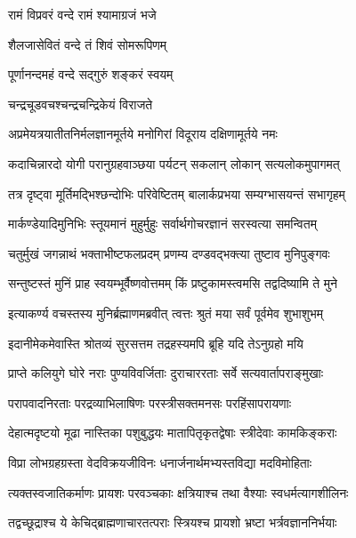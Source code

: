

{रामं विप्रवरं वन्दे रामं श्यामाग्रजं भजे}

{शैलजासेवितं वन्दे तं शिवं सोमरूपिणम्}

{पूर्णानन्दमहं वन्दे सद्गुरुं शङ्करं स्वयम्}

{चन्द्रचूडवचश्चन्द्रचन्द्रिकेयं विराजते}

\twolineshloka
{अप्रमेयत्रयातीतनिर्मलज्ञानमूर्तये}
{मनोगिरां विदूराय दक्षिणामूर्तये नमः} %


\twolineshloka
{कदाचिन्नारदो योगी परानुग्रहवाञ्छया}
{पर्यटन् सकलान् लोकान् सत्यलोकमुपागमत्} %

\twolineshloka
{तत्र दृष्ट्वा मूर्तिमद्भिश्छन्दोभिः परिवेष्टितम्}
{बालार्कप्रभया सम्यग्भासयन्तं सभागृहम्} %

\twolineshloka
{मार्कण्डेयादिमुनिभिः स्तूयमानं मुहुर्मुहुः}
{सर्वार्थगोचरज्ञानं सरस्वत्या समन्वितम्} %

\twolineshloka
{चतुर्मुखं जगन्नाथं भक्ताभीष्टफलप्रदम्}
{प्रणम्य दण्डवद्भक्त्या तुष्टाव मुनिपुङ्गवः} %

\twolineshloka
{सन्तुष्टस्तं मुनिं प्राह स्वयम्भूर्वैष्णवोत्तमम्}
{किं प्रष्टुकामस्त्वमसि तद्वदिष्यामि ते मुने} %

\twolineshloka
{इत्याकर्ण्य वचस्तस्य मुनिर्ब्रह्माणमब्रवीत्}
{त्वत्तः श्रुतं मया सर्वं पूर्वमेव शुभाशुभम्} %

\twolineshloka
{इदानीमेकमेवास्ति श्रोतव्यं सुरसत्तम}
{तद्रहस्यमपि ब्रूहि यदि तेऽनुग्रहो मयि} %

\twolineshloka
{प्राप्ते कलियुगे घोरे नराः पुण्यविवर्जिताः}
{दुराचाररताः सर्वे सत्यवार्तापराङ्मुखाः} %

\twolineshloka
{परापवादनिरताः परद्रव्याभिलाषिणः}
{परस्त्रीसक्तमनसः परहिंसापरायणाः} %

\twolineshloka
{देहात्मदृष्टयो मूढा नास्तिका पशुबुद्धयः}
{मातापितृकृतद्वेषाः स्त्रीदेवाः कामकिङ्कराः} %

\twolineshloka
{विप्रा लोभग्रहग्रस्ता वेदविक्रयजीविनः}
{धनार्जनार्थमभ्यस्तविद्या मदविमोहिताः} %

\twolineshloka
{त्यक्तस्वजातिकर्माणः प्रायशः परवञ्चकाः}
{क्षत्रियाश्च तथा वैश्याः स्वधर्मत्यागशीलिनः} %

\twolineshloka
{तद्वच्छूद्राश्च ये केचिद्ब्राह्मणाचारतत्पराः}
{स्त्रियश्च प्रायशो भ्रष्टा भर्त्रवज्ञाननिर्भयाः} %

